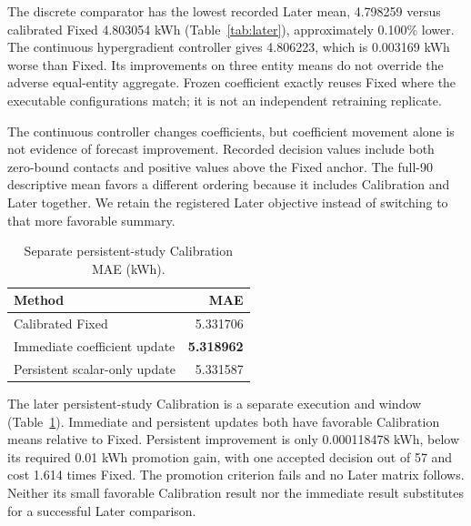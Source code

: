 \documentclass[pdflatex,iicol,sn-mathphys-num]{sn-jnl}
\begin{document}
The discrete comparator has the lowest recorded Later mean, 4.798259 versus calibrated Fixed 4.803054 kWh (Table~\ref{tab:later}), approximately 0.100\% lower. The continuous hypergradient controller gives 4.806223, which is 0.003169 kWh worse than Fixed. Its improvements on three entity means do not override the adverse equal-entity aggregate. Frozen coefficient exactly reuses Fixed where the executable configurations match; it is not an independent retraining replicate.

The continuous controller changes coefficients, but coefficient movement alone is not evidence of forecast improvement. Recorded decision values include both zero-bound contacts and positive values above the Fixed anchor. The full-90 descriptive mean favors a different ordering because it includes Calibration and Later together. We retain the registered Later objective instead of switching to that more favorable summary.

\begin{table}[t]
\centering\small
\caption{Separate persistent-study Calibration MAE (kWh).}\label{tab:persistent}
\begin{tabularx}{\columnwidth}{@{}Xr@{}}\toprule
Method & MAE\\\midrule
Calibrated Fixed & 5.331706\\
Immediate coefficient update & \textbf{5.318962}\\
Persistent scalar-only update & 5.331587\\
\bottomrule\end{tabularx}
\end{table}

The later persistent-study Calibration is a separate execution and window (Table~\ref{tab:persistent}). Immediate and persistent updates both have favorable Calibration means relative to Fixed. Persistent improvement is only 0.000118478 kWh, below its required 0.01 kWh promotion gain, with one accepted decision out of 57 and cost 1.614 times Fixed. The promotion criterion fails and no Later matrix follows. Neither its small favorable Calibration result nor the immediate result substitutes for a successful Later comparison.
\end{document}
